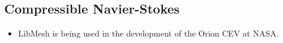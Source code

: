\subsection*{Compressible Navier-Stokes}
\begin{frame}
    \begin{figure}[!htb]
      \begin{center}
      \end{center}
    \end{figure}
\begin{itemize}
\item {LibMesh is being used in the development of the Orion CEV at NASA.}
\end{itemize}
\end{frame}


